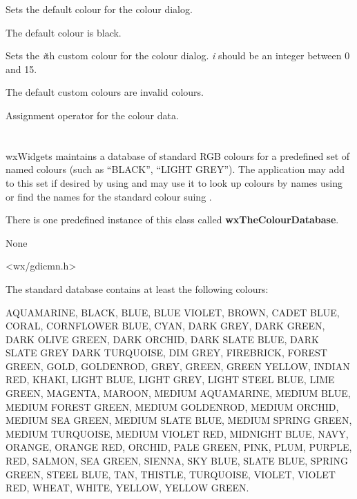 \label{wxcolourdatasetcolour}


Sets the default colour for the colour dialog.

The default colour is black.


\label{wxcolourdatasetcustomcolour}


Sets the {\it i}th custom colour for the colour dialog. {\it i} should
be an integer between 0 and 15.

The default custom colours are invalid colours.


\label{wxcolourdataassign}


Assignment operator for the colour data.




\section{}\label{wxcolourdatabase}

wxWidgets maintains a database of standard RGB colours for a predefined
set of named colours (such as ``BLACK'', ``LIGHT GREY''). The
application may add to this set if desired by using 
 and may use it to look up
colours by names using  or find the names
for the standard colour suing .

There is one predefined instance of this class called 
{\bf wxTheColourDatabase}.


None


<wx/gdicmn.h>


The standard database contains at least the following colours:

AQUAMARINE, BLACK, BLUE, BLUE VIOLET, BROWN, CADET BLUE, CORAL,
CORNFLOWER BLUE, CYAN, DARK GREY, DARK GREEN, DARK OLIVE GREEN, DARK
ORCHID, DARK SLATE BLUE, DARK SLATE GREY DARK TURQUOISE, DIM GREY,
FIREBRICK, FOREST GREEN, GOLD, GOLDENROD, GREY, GREEN, GREEN YELLOW,
INDIAN RED, KHAKI, LIGHT BLUE, LIGHT GREY, LIGHT STEEL BLUE, LIME GREEN,
MAGENTA, MAROON, MEDIUM AQUAMARINE, MEDIUM BLUE, MEDIUM FOREST GREEN,
MEDIUM GOLDENROD, MEDIUM ORCHID, MEDIUM SEA GREEN, MEDIUM SLATE BLUE,
MEDIUM SPRING GREEN, MEDIUM TURQUOISE, MEDIUM VIOLET RED, MIDNIGHT BLUE,
NAVY, ORANGE, ORANGE RED, ORCHID, PALE GREEN, PINK, PLUM, PURPLE, RED,
SALMON, SEA GREEN, SIENNA, SKY BLUE, SLATE BLUE, SPRING GREEN, STEEL
BLUE, TAN, THISTLE, TURQUOISE, VIOLET, VIOLET RED, WHEAT, WHITE, YELLOW,
YELLOW GREEN.

